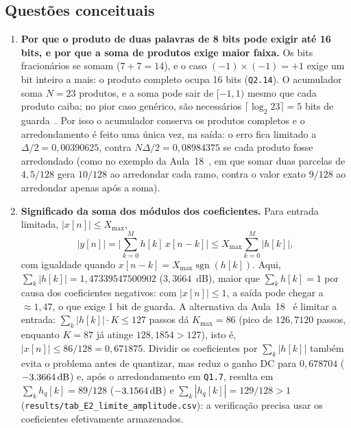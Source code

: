 \documentclass[11pt,a4paper]{article}
\newcommand{\MetricaENormaLI}{1{,}47339547500902}
\newcommand{\MetricaENormaLIdB}{3{,}3664}
\newcommand{\MetricaEKMax}{86}
\newcommand{\MetricaEAMax}{0{,}671875}
\newcommand{\MetricaEPicoK}{126{,}7120}
\newcommand{\MetricaEPicoKI}{128{,}1854}
\newcommand{\MetricaEGanhoDCEsc}{0{,}678704}
\newcommand{\MetricaEGanhoDCEscdB}{-3{,}3664}
\newcommand{\MetricaESomaAbsEscQInt}{129}
\newcommand{\MetricaESomaEscQInt}{89}
\newcommand{\MetricaEGanhoDCEscQdB}{-3{,}1564}
\newcommand{\MetricaEQRamo}{10}
\newcommand{\MetricaEQSoma}{9}
\newcommand{\MetricaEErroRamo}{0{,}08984375}
\newcommand{\MetricaEErroSoma}{0{,}00390625}
\begin{document}
\subsection{Questões conceituais}

\begin{enumerate}[leftmargin=1.6em, itemsep=3pt]
    \item \textbf{Por que o produto de duas palavras de 8 bits pode exigir até 16 bits, e por que a soma de produtos exige maior faixa.}
    Os bits fracionários se somam ($7 + 7 = 14$), e o caso $(-1)\times(-1) = +1$ exige um bit inteiro a mais: o produto completo ocupa 16 bits (\texttt{Q2.14}). O acumulador soma $N = 23$ produtos, e a soma pode sair de $[-1, 1)$ mesmo que cada produto caiba; no pior caso genérico, são necessários $\lceil\log_2 23\rceil = 5$ bits de guarda~\cite{lyons2011}. Por isso o acumulador conserva os produtos completos e o arredondamento é feito uma única vez, na saída: o erro fica limitado a $\Delta/2 = \MetricaEErroSoma$, contra $N\Delta/2 = \MetricaEErroRamo$ se cada produto fosse arredondado (como no exemplo da Aula~18~\cite{aula18}, em que somar duas parcelas de $4,5/128$ gera $\MetricaEQRamo/128$ ao arredondar cada ramo, contra o valor exato $\MetricaEQSoma/128$ ao arredondar apenas após a soma).

    \item \textbf{Significado da soma dos módulos dos coeficientes.}
    Para entrada limitada, $|x[n]| \le X_{\max}$,
    \begin{equation}
        |y[n]| = \Big|\sum_{k=0}^{M} h[k]\,x[n-k]\Big| \le X_{\max}\sum_{k=0}^{M} |h[k]|,
    \end{equation}
    com igualdade quando $x[n-k] = X_{\max}\operatorname{sgn}(h[k])$. Aqui, $\sum_k |h[k]| = \MetricaENormaLI$ ($\MetricaENormaLIdB$~\si{dB}), maior que $\sum_k h[k] = 1$ por causa dos coeficientes negativos: com $|x[n]| \le 1$, a saída pode chegar a $\approx 1,47$, o que exige 1 bit de guarda. A alternativa da Aula~18~\cite{aula18} é limitar a entrada: $\sum_k|h[k]|\cdot K \le 127$ passos dá $K_{\max} = \MetricaEKMax$ (pico de $\MetricaEPicoK$ passos, enquanto $K = 87$ já atinge $\MetricaEPicoKI > 127$), isto é, $|x[n]| \le \MetricaEKMax/128 = \MetricaEAMax$. Dividir os coeficientes por $\sum_k|h[k]|$ também evita o problema antes de quantizar, mas reduz o ganho DC para $\MetricaEGanhoDCEsc$ ($\SI{\MetricaEGanhoDCEscdB}{dB}$) e, após o arredondamento em \texttt{Q1.7}, resulta em $\sum_k h_q[k] = \MetricaESomaEscQInt/128$ ($\SI{\MetricaEGanhoDCEscQdB}{dB}$) e $\sum_k|h_q[k]| = \MetricaESomaAbsEscQInt/128 > 1$ (\texttt{results/tab\_E2\_limite\_amplitude.csv}): a verificação precisa usar os coeficientes efetivamente armazenados.


\end{enumerate}
\end{document}
